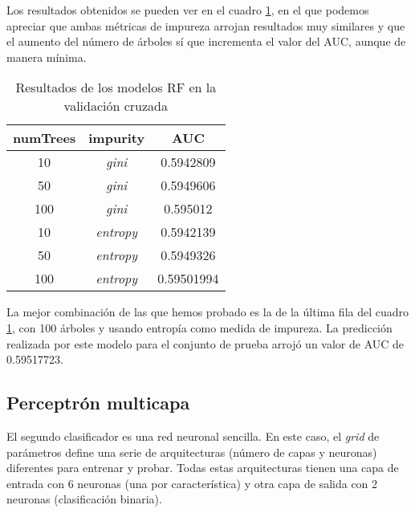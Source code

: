 Los resultados obtenidos se pueden ver en el cuadro \ref{tab:validation-rf}, en
el que podemos apreciar que ambas métricas de impureza arrojan resultados muy
similares y que el aumento del número de árboles sí que incrementa el valor del
AUC, aunque de manera mínima.

\begin{table}[h!]
    \caption{Resultados de los modelos RF en la validación cruzada}
    \label{tab:validation-rf}
    \begin{center}
        \begin{tabular}{ |c|c|c| }
            \hline
            \textbf{numTrees} & \textbf{impurity} & \textbf{AUC} \\
            \hline
            10                & \textit{gini}     & 0.5942809    \\
            \hline
            50                & \textit{gini}     & 0.5949606    \\
            \hline
            100               & \textit{gini}     & 0.595012     \\
            \hline
            10                & \textit{entropy}  & 0.5942139    \\
            \hline
            50                & \textit{entropy}  & 0.5949326    \\
            \hline
            100               & \textit{entropy}  & 0.59501994   \\
            \hline
        \end{tabular}
    \end{center}
\end{table}

La mejor combinación de las que hemos probado es la de la última fila del cuadro
\ref{tab:validation-rf}, con 100 árboles y usando entropía como medida de
impureza. La predicción realizada por este modelo para el conjunto de prueba
arrojó un valor de AUC de 0.59517723.

\subsection{Perceptrón multicapa}

El segundo clasificador es una red neuronal sencilla. En este caso, el
\textit{grid} de parámetros define una serie de arquitecturas (número de capas y
neuronas) diferentes para entrenar y probar. Todas estas arquitecturas tienen
una capa de entrada con 6 neuronas (una por característica) y otra capa de
salida con 2 neuronas (clasificación binaria).


